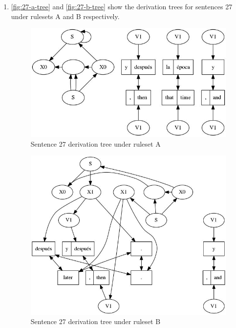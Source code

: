 \documentclass[a4paper,oneside,reqno]{amsart}
\begin{document}
\begin{enumerate}[label=\arabic*.]
  \item
    \autoref{fig:27-a-tree} and \autoref{fig:27-b-tree} show the derivation
    trees for sentences 27 under rulesets A and B respectively.
    \begin{figure}[h!]
      \begin{center}
        \includegraphics[scale=0.5]{../output/tree27Advn1.jpg}
      \end{center}
      \caption{Sentence 27 derivation tree under ruleset A}
      \label{fig:27-a-tree}
    \end{figure}
    \begin{figure}[h!]
      \begin{center}
        \includegraphics[scale=0.5]{../output/tree27Bdvn1.jpg}
      \end{center}
      \caption{Sentence 27 derivation tree under ruleset B}
      \label{fig:27-b-tree}
    \end{figure}


\end{enumerate}
\end{document}
